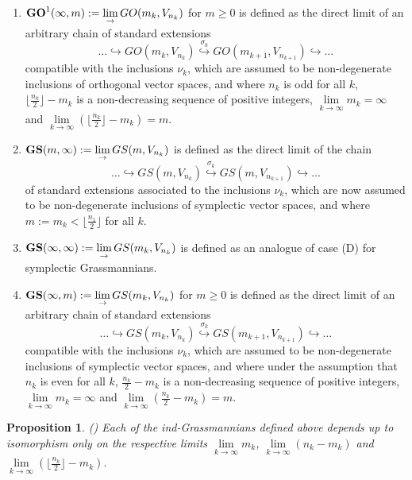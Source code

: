 \documentclass[12pt]{amsart}
\newtheorem{prop}[theorem]{Proposition}
\begin{document}
\begin{enumerate}
\item[{\rm (F)}] ${\bf GO}^1(\infty,m):=\lim\limits_{\to} GO(m_k,V_{n_k})$ for $m\geq 0$ is defined as the direct limit of an arbitrary chain of standard extensions
$$
\dots \hookrightarrow GO(m_k,V_{n_k}) \stackrel{\sigma_k}{\hookrightarrow} GO(m_{k+1},V_{n_{k+1}}) \hookrightarrow \dots
$$
compatible with the inclusions $\nu_k$, which are assumed to be non-degenerate inclusions of orthogonal vector spaces, and where $n_k$ is odd for all $k$, $\lfloor \frac{n_k}{2}\rfloor-m_k$ is a non-decreasing sequence of positive integers, $\lim\limits_{k\to\infty} m_k=\infty$ and $\lim\limits_{k\to\infty} (\lfloor \frac{n_k}{2}\rfloor-m_k)=m$.

\item[{\rm (G)}] ${\bf GS}(m,\infty):=\lim\limits_{\to} GS(m,V_{n_k})$ is defined as the direct limit of the chain
$$
\dots \hookrightarrow GS(m,V_{n_k}) \stackrel{\sigma_k}{\hookrightarrow} GS(m,V_{n_{k+1}}) \hookrightarrow \dots
$$
of standard extensions associated to the inclusions $\nu_k$, which are now assumed to be non-degenerate inclusions of symplectic vector spaces, and where $m:= m_k< \lfloor \frac{n_1}{2}\rfloor$ for all $k$.

\item[{\rm (H)}] ${\bf GS}(\infty,\infty):=\lim\limits_{\to} GS(m_k,V_{n_k})$ is defined as an analogue of case (D) for symplectic Grassmannians.

\item[{\rm (I)}] ${\bf GS}(\infty,m):=\lim\limits_{\to} GS(m_k,V_{n_k})$ for $m\geq 0$ is defined as the direct limit of an arbitrary chain of standard extensions
$$
\dots \hookrightarrow GS(m_k,V_{n_k}) \stackrel{\sigma_k}{\hookrightarrow} GS(m_{k+1},V_{n_{k+1}}) \hookrightarrow \dots
$$
compatible with the inclusions $\nu_k$, which are assumed to be non-degenerate inclusions of symplectic vector spaces, and where under the assumption that $n_k$ is even for all $k$, $\frac{n_k}{2}-m_k$ is a non-decreasing sequence of positive integers, $\lim\limits_{k\to\infty} m_k=\infty$ and $\lim\limits_{k\to\infty} (\frac{n_k}{2}-m_k)=m$.
\end{enumerate}

\begin{prop}{\rm (\cite[Lemma 4.3]{Penkov-Tikhomirov-Lin-ind-Grass})}
Each of the ind-Grassmannians defined above depends up to isomorphism only on the respective limits $\lim\limits_{k\to\infty} m_k$, $\lim\limits_{k\to\infty} (n_k-m_k)$ and $\lim\limits_{k\to\infty} (\lfloor\frac{n_k}{2}\rfloor-m_k)$.
\end{prop}
\end{document}
